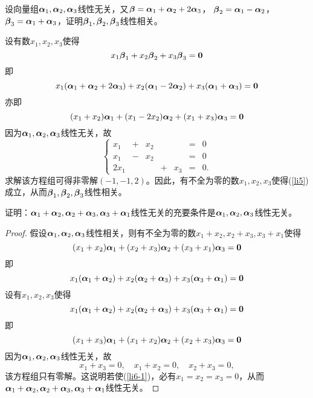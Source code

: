 \begin{frame}
\begin{li}
  设向量组$\boldsymbol{\alpha}_1,\boldsymbol{\alpha}_2,\boldsymbol{\alpha}_3$线性无关，又$\boldsymbol{\beta}=\boldsymbol{\alpha}_1+\boldsymbol{\alpha}_2+2\boldsymbol{\alpha}_3$，
  $\boldsymbol{\beta}_2=\boldsymbol{\alpha}_1-\boldsymbol{\alpha}_2$，$\boldsymbol{\beta}_3=\boldsymbol{\alpha}_1+\boldsymbol{\alpha}_3$，证明$\boldsymbol{\beta}_1,\boldsymbol{\beta}_2,\boldsymbol{\beta}_3$线性相关。       
\end{li} \pause 
\begin{jie}
设有数$x_1,x_2,x_3$使得
\begin{equation}\label{li5}
  x_1\betabd_1+x_2\betabd_2+x_3\betabd_3=\M0
\end{equation}    
即
$$
x_1(\alphabd_1+\alphabd_2+2\alphabd_3)+x_2(\alphabd_1-2\alphabd_2)+x_3(\alphabd_1+\alphabd_3)=\M0
$$
亦即
$$
(x_1+x_2)\alphabd_1+(x_1-2x_2)\alphabd_2+(x_1+x_3)\alphabd_3=\M0
$$
因为$\boldsymbol{\alpha}_1,\boldsymbol{\alpha}_2,\boldsymbol{\alpha}_3$线性无关，故
$$
\left\{
\begin{array}{rcrcrcrcr}
  x_1&+&x_2&&&=&0\\
  x_1&-&x_2&&&=&0\\
  2x_1&&&+&x_3&=&0.
\end{array}
\right.
$$
求解该方程组可得非零解$(-1,-1,2)$。因此，有不全为零的数$x_1,x_2,x_3$使得(\ref{li5})成立，从而$\boldsymbol{\beta}_1,\boldsymbol{\beta}_2,\boldsymbol{\beta}_3$线性相关。
\end{jie}
\end{frame}

\begin{frame}
\begin{li}
  证明：$\boldsymbol{\alpha}_1+\boldsymbol{\alpha}_2,\boldsymbol{\alpha}_2+\boldsymbol{\alpha}_3,\boldsymbol{\alpha}_3+\boldsymbol{\alpha}_1$线性无关的充要条件是$\boldsymbol{\alpha}_1,\boldsymbol{\alpha}_2,\boldsymbol{\alpha}_3$线性无关。
\end{li}
\begin{proof}
\red{($\Rightarrow$)} \quad
假设$\boldsymbol{\alpha}_1,\boldsymbol{\alpha}_2,\boldsymbol{\alpha}_3$线性相关，则有不全为零的数$x_1+x_2,x_2+x_3,x_3+x_1$使得
$$
(x_1+x_2)\alphabd_1+(x_2+x_3)\alphabd_2+(x_3+x_1)\alphabd_3=\M0
$$
即
$$
x_1(\alphabd_1+\alphabd_2)+x_2(\alphabd_2+\alphabd_3)+x_3(\alphabd_3+\alphabd_1)=\M0
$$
\pause 
\red{($\Leftarrow$)} \quad
设有$x_1,x_2,x_3$使得
\begin{equation}\label{li6-1}
  x_1(\alphabd_1+\alphabd_2)+x_2(\alphabd_2+\alphabd_3)+x_3(\alphabd_3+\alphabd_1)=\M0
\end{equation}
即
$$
(x_1+x_3)\alphabd_1+(x_1+x_2)\alphabd_2+(x_2+x_3)\alphabd_3=\M0
$$
因为$\boldsymbol{\alpha}_1,\boldsymbol{\alpha}_2,\boldsymbol{\alpha}_3$线性无关，故
$$
x_1+x_3=0, \quad x_1+x_2=0, \quad x_2+x_3=0,
$$
该方程组只有零解。这说明若使(\ref{li6-1})，必有$x_1=x_2=x_3=0$，从而$\boldsymbol{\alpha}_1+\boldsymbol{\alpha}_2,\boldsymbol{\alpha}_2+\boldsymbol{\alpha}_3,\boldsymbol{\alpha}_3+\boldsymbol{\alpha}_1$线性无关。
\end{proof}
\end{frame}

